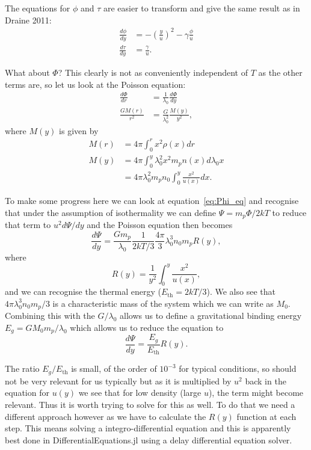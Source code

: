 \documentclass[11pt]{article}
\newcommand{\ddr}[1]{\frac{d#1}{dr}}
\newcommand{\ddy}[1]{\frac{d#1}{dy}}
\newcommand{\transPhi}{\Psi}
\begin{document}
The equations for $\phi$ and $\tau$ are easier to transform and give the same result as in Draine 2011:
\begin{align}
  \label{eq:phi_eq}
  \ddy{\phi} & = -\left(\frac{y}{u}\right)^2-\gamma \frac{\phi}{u}\\
  \label{eq:tau_eq}
  \ddy{\tau} & = \frac{\gamma}{u}.
\end{align}

What about $\Phi$? This clearly is not as conveniently independent of $T$ as the other terms are, so let us look at the Poisson equation:
\begin{align}
  \label{eq:15}
  \ddr{\Phi} & = \frac{1}{\lambda_0} \ddy{\Phi}\\
  \label{eq:16}
  \frac{GM(r)}{r^2} & = \frac{G}{\lambda_0^2} \frac{M(y)}{y^2},
\end{align}
where $M(y)$ is given by
\begin{align}
  \label{eq:16}
  M(r) & = 4\pi \int_0^r x^2 \rho(x)dr \\
  M(y) & = 4\pi \int_0^y \lambda_0^2 x^2 m_p n(x) d\lambda_0 x \\
       & = 4\pi \lambda_0^2 m_p n_0 \int_0^y \frac{x^2}{u(x)} dx.
\end{align}

To make some progress here we can look at equation~\eqref{eq:Phi_eq} and recognise that under the assumption of isothermality we can define $\transPhi = m_p\Phi/2 kT$ to reduce that term to $u^2d\transPhi/dy$ and the Poisson equation then becomes
\begin{equation}
  \label{eq:9}
  \frac{d\transPhi}{dy} = \frac{G m_p}{\lambda_0}\frac{1}{2kT/3} \frac{4\pi}{3} \lambda_0^3 n_0 m_p R(y),
\end{equation}
where
\begin{equation}
  \label{eq:17}
  R(y) = \frac{1}{y^2}\int_0^y \frac{x^2}{u(x)},
\end{equation}
and we can recognise the thermal energy ($E_{\mathrm{th}} = 2kT/3$). We also see that $4\pi \lambda_0^3 n_0 m_p/3$ is a characteristic mass of the system which we can write as $M_0$. Combining this with the $G/\lambda_0$ allows us to define a gravitational binding energy $E_g = GM_0m_p/\lambda_0$ which allows us to reduce the equation to 
\begin{equation}
  \label{eq:transPhi_eq}
  \ddy{\transPhi} = \frac{E_g}{E_{\mathrm{th}}} R(y).
\end{equation}

The ratio $E_g/E_{\mathrm{th}}$ is small, of the order of $10^{-3}$ for typical conditions, so should not be very relevant for us typically but as it is multiplied by $u^2$ back in the equation for $u(y)$ we see that for low density (large $u$), the term might become relevant. Thus it is worth trying to solve for this as well. To do that we need a different approach however as we have to calculate the $R(y)$ function at each step. This means solving a integro-differential equation and this is apparently best done in DifferentialEquations.jl using a delay differential equation solver.
\end{document}
